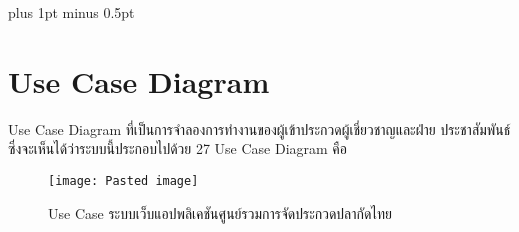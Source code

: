 
\clearpage
\thispagestyle{plain}

\begingroup
\fontsize{16pt}{19.2pt}\selectfont
\justifying
\XeTeXlinebreakskip=0pt plus 1pt minus 0.5pt
\setlength{\parindent}{1.5cm}
\setlength{\parskip}{0pt}


\section*{Use Case Diagram}

\indent Use Case Diagram ที่เป็นการจำลองการทำงานของผู้เข้าประกวดผู้เชี่ยวชาญและฝ่าย
ประชาสัมพันธ์ซึ่งจะเห็นได้ว่าระบบนี้ประกอบไปด้วย 27 Use Case Diagram คือ

\vspace{\baselineskip}

\begin{figure}[h]
	\centering
	\texttt{[image: Pasted image]}
	\caption{Use Case ระบบเว็บแอปพลิเคชันศูนย์รวมการจัดประกวดปลากัดไทย}
\end{figure}

\setlength{\LoneLabelSep}{0.5em}
\settowidth{\LoneLabelWidth}{9.}
\setlength{\LoneContentCol}{\dimexpr 1.5cm + \LoneLabelWidth + \LoneLabelSep\relax}

\setlength{\LtwoLabelSep}{0.5em}
\settowidth{\LtwoLabelWidth}{9.9.}
\setlength{\ExtraAlign}{-2.8em}


